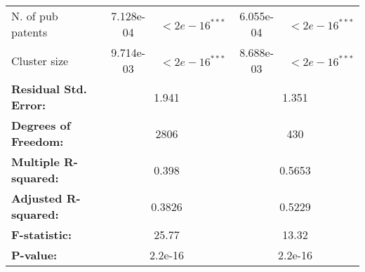 \documentclass{article}
\begin{document}
\begin{table}[h!]
\begin{tabular}{lcccc}
N. of pub patents               & 7.128e-04 & $<2e-16^{***}$ & 6.055e-04 & $<2e-16^{***}$ \\
Cluster size       & 9.714e-03 & $<2e-16^{***}$ & 8.688e-03 & $<2e-16^{***}$ \\
\midrule
\multicolumn{1}{l}{\textbf{Residual Std. Error:}} & \multicolumn{2}{c}{1.941} & \multicolumn{2}{c}{1.351} \\
\multicolumn{1}{l}{\textbf{Degrees of Freedom:}} & \multicolumn{2}{c}{2806} & \multicolumn{2}{c}{430} \\
\multicolumn{1}{l}{\textbf{Multiple R-squared:}} & \multicolumn{2}{c}{0.398} & \multicolumn{2}{c}{0.5653} \\
\multicolumn{1}{l}{\textbf{Adjusted R-squared:}} & \multicolumn{2}{c}{0.3826} & \multicolumn{2}{c}{0.5229} \\
\multicolumn{1}{l}{\textbf{F-statistic:}} & \multicolumn{2}{c}{25.77} & \multicolumn{2}{c}{13.32} \\
\multicolumn{1}{l}{\textbf{P-value:}} & \multicolumn{2}{c}{2.2e-16} & \multicolumn{2}{c}{ 2.2e-16} \\
\bottomrule
\end{tabular}
\end{table}
\end{document}
